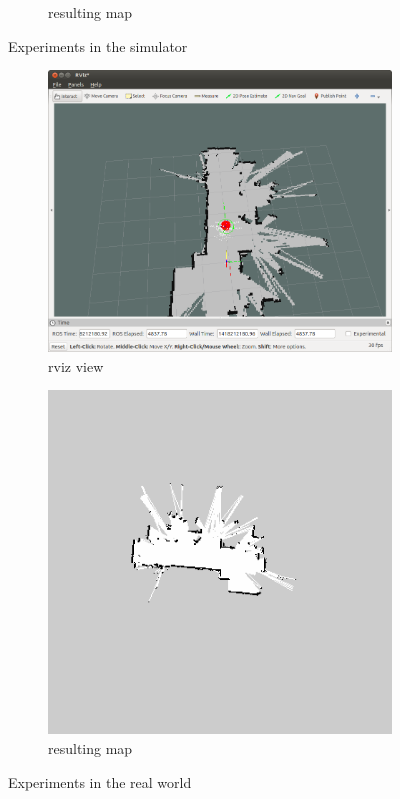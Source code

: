 \documentclass[a4paper]{article}
\begin{document}
\begin{figure}[h!]
\begin{subfigure}[b]{0.8\textwidth}
    \caption{resulting map}
  \end{subfigure}
  \caption{Experiments in the simulator}
  \label{fig:navigationresults}
\end{figure}

\begin{figure}[h!]
  \centering
  \begin{subfigure}[b]{0.8\textwidth}
    \includegraphics[width=\textwidth,height=\textheight,keepaspectratio]{img/navigation_real_rviz.png}
    \caption{rviz view}
  \end{subfigure}
  \begin{subfigure}[b]{0.8\textwidth}
    \includegraphics[width=\textwidth,height=\textheight,keepaspectratio]{img/gmapping_real_map.png}
    \caption{resulting map}
  \end{subfigure}
  \caption{Experiments in the real world}
  \label{fig:navigationresults}
\end{figure}
\end{document}
